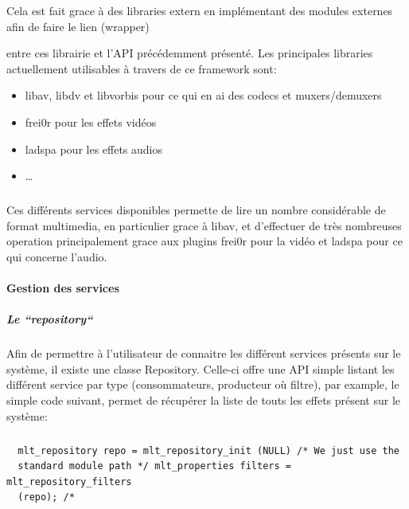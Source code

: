 Cela est fait grace à des libraries extern en implémentant des modules
externes afin de faire le lien (wrapper)

 entre ces librairie et l'API précédemment
présenté. Les principales libraries actuellement utilisables à travers
de ce framework sont:

\begin{itemize}

  \item {libav, libdv et libvorbis pour ce qui en ai des codecs et
  muxers/demuxers}

  \item {frei0r pour les effets vidéos}

  \item {ladspa pour les effets audios}

  \item {\ldots}

\end{itemize}

\subparagraph{}

Ces différents services disponibles permette de lire un nombre
considérable de format multimedia, en particulier grace à libav,
et d'effectuer de très nombreuses operation principalement grace aux
plugins frei0r pour la vidéo et ladspa pour ce qui concerne l'audio.

\paragraph{Gestion des services}

\subparagraph{Le ``repository``}

Afin de permettre à l'utilisateur de connaitre les différent services
présents sur le système, il existe une classe Repository. Celle-ci
offre une API simple listant les différent service par type
(consommateurs, producteur où filtre),  par example, le simple code
suivant, permet de récupérer la liste de touts les effets présent
sur le système:

\subparagraph{}

\begin{lstlisting}
  mlt_repository repo = mlt_repository_init (NULL) /* We just use the
  standard module path */ mlt_properties filters = mlt_repository_filters
  (repo); /*
\end{lstlisting}

